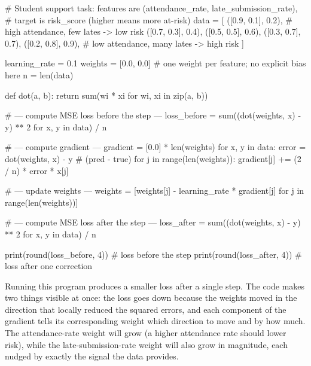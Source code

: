 \begin{codeexample}[caption={From scratch: one gradient descent step for linear regression}]
# Student support task: features are (attendance_rate, late_submission_rate),
# target is risk_score (higher means more at-risk)
data = [
    ([0.9, 0.1], 0.2),   # high attendance, few lates -> low risk
    ([0.7, 0.3], 0.4),
    ([0.5, 0.5], 0.6),
    ([0.3, 0.7], 0.7),
    ([0.2, 0.8], 0.9),   # low attendance, many lates -> high risk
]

learning_rate = 0.1
weights = [0.0, 0.0]   # one weight per feature; no explicit bias here
n = len(data)

def dot(a, b):
    return sum(wi * xi for wi, xi in zip(a, b))

# --- compute MSE loss before the step ---
loss_before = sum((dot(weights, x) - y) ** 2 for x, y in data) / n

# --- compute gradient ---
gradient = [0.0] * len(weights)
for x, y in data:
    error = dot(weights, x) - y     # (pred - true)
    for j in range(len(weights)):
        gradient[j] += (2 / n) * error * x[j]

# --- update weights ---
weights = [weights[j] - learning_rate * gradient[j]
           for j in range(len(weights))]

# --- compute MSE loss after the step ---
loss_after = sum((dot(weights, x) - y) ** 2 for x, y in data) / n

print(round(loss_before, 4))   # loss before the step
print(round(loss_after, 4))    # loss after one correction
\end{codeexample}

Running this program produces a smaller loss after a single step. The code makes two things visible at once: the loss goes down because the weights moved in the direction that locally reduced the squared errors, and each component of the gradient tells its corresponding weight which direction to move and by how much. The attendance-rate weight will grow (a higher attendance rate should lower risk), while the late-submission-rate weight will also grow in magnitude, each nudged by exactly the signal the data provides.

